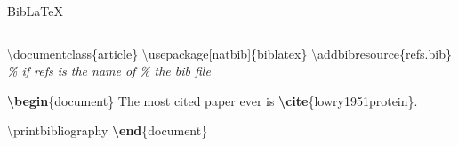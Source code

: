 \documentclass[,aspectratio=43]{beamer}
\newcommand{\VERB}{\Verb[commandchars=\\\{\}]}
\newenvironment{Shaded}{\begin{snugshade}}{\end{snugshade}}
\newcommand{\BuiltInTok}[1]{#1}
\newcommand{\CommentTok}[1]{\textcolor[rgb]{0.38,0.63,0.69}{\textit{#1}}}
\newcommand{\ExtensionTok}[1]{#1}
\newcommand{\FunctionTok}[1]{\textcolor[rgb]{0.02,0.16,0.49}{#1}}
\newcommand{\KeywordTok}[1]{\textcolor[rgb]{0.00,0.44,0.13}{\textbf{#1}}}
\newcommand{\NormalTok}[1]{#1}
\begin{document}
\begin{frame}[fragile]{Bib\LaTeX}
\protect\hypertarget{bib}{}

\begin{columns}[T]
\begin{column}{0.53\textwidth}
\small
\vspace{-1em}

\begin{Shaded}
\begin{Highlighting}[]
\BuiltInTok{\textbackslash{}documentclass}\NormalTok{\{}\ExtensionTok{article}\NormalTok{\} }
\BuiltInTok{\textbackslash{}usepackage}\NormalTok{[natbib]\{}\ExtensionTok{biblatex}\NormalTok{\} }
\FunctionTok{\textbackslash{}addbibresource}\NormalTok{\{refs.bib\}}
\CommentTok{\% if \textquotesingle{}refs\textquotesingle{} is the name of }
\CommentTok{\% the bib file}

\KeywordTok{\textbackslash{}begin}\NormalTok{\{}\ExtensionTok{document}\NormalTok{\}}
\NormalTok{The most cited paper ever is }
\KeywordTok{\textbackslash{}cite}\NormalTok{\{}\ExtensionTok{lowry1951protein}\NormalTok{\}.}

\FunctionTok{\textbackslash{}printbibliography}
\KeywordTok{\textbackslash{}end}\NormalTok{\{}\ExtensionTok{document}\NormalTok{\}}
\end{Highlighting}
\end{Shaded}
\end{column}


\end{columns}
\end{frame}
\end{document}
